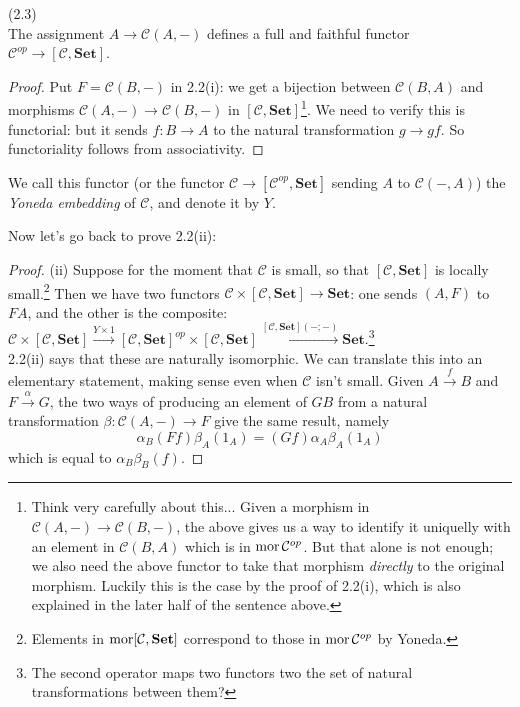 \documentclass[a4paper]{article}
\begin{document}
\begin{coro} (2.3)\\
    The assignment $A \to \mathcal{C}(A,-)$ defines a full and faithful functor $\mathcal{C}^{op} \to [\mathcal{C},\mathbf{Set}]$.
    \begin{proof}
        Put $F = \mathcal{C}(B,-)$ in 2.2(i): we get a bijection between $\mathcal{C}(B,A)$ and morphisms $\mathcal{C}(A,-) \to \mathcal{C}(B,-)$ in $[\mathcal{C},\mathbf{Set}]$\footnote{Think very carefully about this... Given a morphism in $\mathcal{C}(A,-) \to \mathcal{C}(B,-)$, the above gives us a way to identify it uniquelly with an element in $\mathcal{C}(B,A)$ which is in $\operatorname{mor} \mathcal{C}^{op}$. But that alone is not enough; we also need the above functor to take that morphism \emph{directly} to the original morphism. Luckily this is the case by the proof of 2.2(i), which is also explained in the later half of the sentence above.}. We need to verify this is functorial: but it sends $f:B \to A$ to the natural transformation $g \to gf$. So functoriality follows from associativity.
    \end{proof}
\end{coro}

We call this functor (or the functor $\mathcal{C} \to [\mathcal{C}^{op}, \mathbf{Set}]$ sending $A$ to $\mathcal{C}(-,A)$) the \emph{Yoneda embedding} of $\mathcal{C}$, and denote it by $Y$.

Now let's go back to prove 2.2(ii):
\begin{proof}
    (ii) Suppose for the moment that $\mathcal{C}$ is small, so that $[\mathcal{C},\mathbf{Set}]$ is locally small.\footnote{Elements in $\operatorname{mor} [\mathcal{C},\mathbf{Set}]$ correspond to those in $\operatorname{mor} \mathcal{C}^{op}$ by Yoneda.} Then we have two functors $\mathcal{C} \times [\mathcal{C},\mathbf{Set}] \to \mathbf{Set}$: one sends $(A,F)$ to $FA$, and the other is the composite: $\mathcal{C} \times [\mathcal{C},\mathbf{Set}] \xrightarrow{Y \times 1} [\mathcal{C},\mathbf{Set}]^{op} \times [\mathcal{C},\mathbf{Set}] \xrightarrow{[\mathcal{C},\mathbf{Set}](-;-)} \mathbf{Set}$.\footnote{The second operator maps two functors two the set of natural transformations between them?}\\
    2.2(ii) says that these are naturally isomorphic. We can translate this into an elementary statement, making sense even when $\mathcal{C}$ isn't small. Given $A \xrightarrow{f} B$ and $F \xrightarrow{\alpha}G$, the two ways of producing an element of $GB$ from a natural transformation $\beta:\mathcal{C}(A,-) \to F$ give the same result, namely $$\alpha_B(Ff)\beta_A(1_A) = (Gf)\alpha_A\beta_A(1_A)$$ which is equal to $\alpha_B\beta_B(f)$.
\end{proof}
\end{document}
